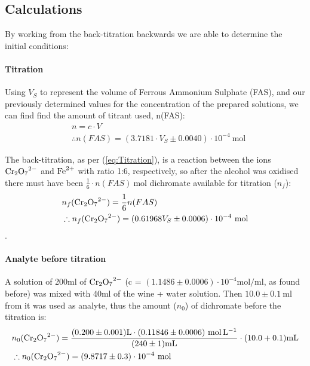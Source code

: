 \subsection{Calculations}
By working from the back-titration backwards we are able to determine the initial conditions:

\paragraph{Titration}

Using $V_{S}$ to represent the volume of Ferrous Ammonium Sulphate (FAS), and our previously determined values for the concentration of the prepared solutions, we can find find the amount of titrant used, n(FAS):
\begin{equation}
\begin{split}
	&n = c \cdot V \\
	&\therefore n(FAS) = (3.7181 \cdot V_{S}  \pm 0.0040)  \cdot 10^{-4} \ \si{\mole}
\end{split}	
\end{equation}

The back-titration, as per (\ref{eq:Titration}), is a reaction between the ions $\ce{Cr2O7^{2-}}$ and $\ce{Fe^{2+}}$ with ratio 1:6, respectively, so after the alcohol was oxidised there must have been $\frac{1}{6} \cdot n(FAS) \ \si{\mole}$ dichromate available for titration ($n_f$):
\begin{equation}
\begin{split}
	&n_f(\ce{Cr2O7^{2-}}) = \frac{1}{6} n(FAS) \\
	&\therefore n_f(\ce{Cr2O7^{2-}}) = (0.61968 V_{S} \pm 0.0006) \cdot 10^{-4} \ \si{\mole}
\end{split}
\end{equation}. 

\paragraph{Analyte before titration}

A solution of 200ml of $\ce{Cr2O7^{2-}}$ (c = $(1.1486 \pm 0.0006 )\cdot 10^{-4} \si{\mol\per\milli\litre}$, as found before) was mixed with 40ml of the wine + water solution. Then $10.0 \pm \SI{0.1}{\milli\litre}$ from it was used as analyte, thus the amount ($n_0$) of dichromate before the titration is:
\begin{equation}\begin{split}
	&n_{0}(\ce{Cr2O7^{2-}}) = \frac{(0.200 \pm 0.001)\si{\litre}\cdot (0.11846 \pm 0.0006) \ \si{\mole\per\litre} }{(240 \pm 1)\si{\milli\litre}} \cdot (10.0 + 0.1)\si{\milli\litre} \\
	&\therefore n_{0}(\ce{Cr2O7^{2-}}) = (9.8717 \pm 0.3) \cdot 10^{-4} \ \si{\mole}
\end{split} 
\end{equation}

